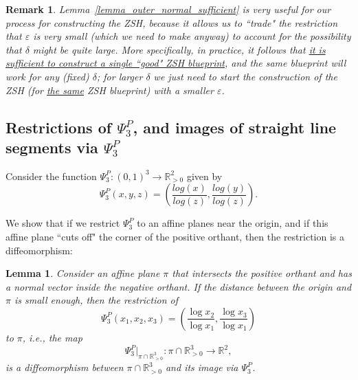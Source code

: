 \documentclass[12pt,letterpaper]{article}
\newtheorem{lem}[thm]{Lemma}
\newtheorem{rem}[thm]{Remark}
\newcommand{\RRp}{\mathbb{R}_{>0}}
\newcommand{\eps}{\varepsilon}
\begin{document}
\bigskip

\begin{rem}
\label{rem_outer_normal_sufficient}
%
Lemma~\ref{lemma_outer_normal_sufficient} is very useful for our process for constructing the ZSH, because it allows us to ``trade" the restriction that $\eps$ is very small (which we need to make anyway) to account for the  possibility that $\delta$ might be quite large. More specifically, in practice, it follows that \ul{it is sufficient to construct a single ``good" ZSH blueprint}, and the same blueprint will work for any (fixed) $\delta$; for larger $\delta$ we just need to start the construction of the ZSH (for \ul{the same} ZSH blueprint) with a smaller $\eps$. 



\end{rem}











\bigskip

   

\subsection{Restrictions of $\Psi_3^P$, and images of straight line segments via $\Psi_3^P$}

\noindent
Consider the function $\Psi_3^P : (0,1)^3 \to \RRp^2$ given by
$$
\Psi_3^P(x,y,z) = \left( \frac{log(x)}{log(z)}, \frac{log(y)}{log(z)} \right).
$$

We show that if we restrict  $\Psi_3^P$ to an affine planes near the origin, and if this affine plane  ``cuts off" the corner of the positive orthant, then the restriction is a diffeomorphism: 

\begin{lem}
\label{lemma_restriction_is_diffeo} 
Consider an affine plane $\pi$ that intersects the positive orthant and has a normal vector inside the negative orthant. If the distance between the origin and $\pi$ is small enough, then the restriction of 
$$
\Psi_3^P(x_1, x_2, x_3) = \left( \frac{\log x_2}{\log x_1}, \frac{\log x_3}{\log x_1} \right)
$$ 
to $\pi$, i.e., the map 
$$
{\Psi_3^P \Big |}_{\pi \cap \mathbb{R}^3_{>0}} : \pi \cap \mathbb{R}^3_{>0} \to \mathbb{R}^2,
$$
is a {\em diffeomorphism} between $\pi \cap \mathbb{R}^3_{>0}$ and its image via $\Psi_3^P$.
\end{lem}
\end{document}
